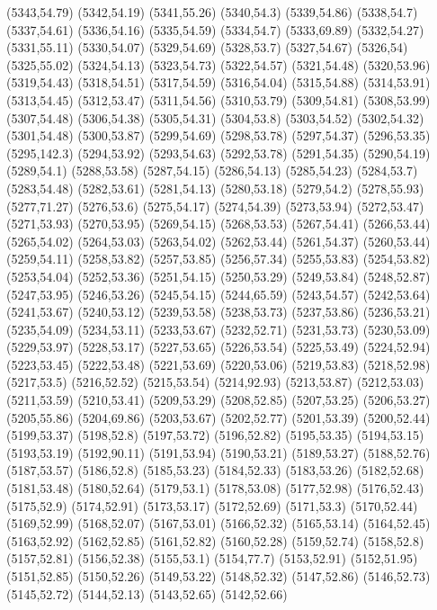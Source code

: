 (5343,54.79)
(5342,54.19)
(5341,55.26)
(5340,54.3)
(5339,54.86)
(5338,54.7)
(5337,54.61)
(5336,54.16)
(5335,54.59)
(5334,54.7)
(5333,69.89)
(5332,54.27)
(5331,55.11)
(5330,54.07)
(5329,54.69)
(5328,53.7)
(5327,54.67)
(5326,54)
(5325,55.02)
(5324,54.13)
(5323,54.73)
(5322,54.57)
(5321,54.48)
(5320,53.96)
(5319,54.43)
(5318,54.51)
(5317,54.59)
(5316,54.04)
(5315,54.88)
(5314,53.91)
(5313,54.45)
(5312,53.47)
(5311,54.56)
(5310,53.79)
(5309,54.81)
(5308,53.99)
(5307,54.48)
(5306,54.38)
(5305,54.31)
(5304,53.8)
(5303,54.52)
(5302,54.32)
(5301,54.48)
(5300,53.87)
(5299,54.69)
(5298,53.78)
(5297,54.37)
(5296,53.35)
(5295,142.3)
(5294,53.92)
(5293,54.63)
(5292,53.78)
(5291,54.35)
(5290,54.19)
(5289,54.1)
(5288,53.58)
(5287,54.15)
(5286,54.13)
(5285,54.23)
(5284,53.7)
(5283,54.48)
(5282,53.61)
(5281,54.13)
(5280,53.18)
(5279,54.2)
(5278,55.93)
(5277,71.27)
(5276,53.6)
(5275,54.17)
(5274,54.39)
(5273,53.94)
(5272,53.47)
(5271,53.93)
(5270,53.95)
(5269,54.15)
(5268,53.53)
(5267,54.41)
(5266,53.44)
(5265,54.02)
(5264,53.03)
(5263,54.02)
(5262,53.44)
(5261,54.37)
(5260,53.44)
(5259,54.11)
(5258,53.82)
(5257,53.85)
(5256,57.34)
(5255,53.83)
(5254,53.82)
(5253,54.04)
(5252,53.36)
(5251,54.15)
(5250,53.29)
(5249,53.84)
(5248,52.87)
(5247,53.95)
(5246,53.26)
(5245,54.15)
(5244,65.59)
(5243,54.57)
(5242,53.64)
(5241,53.67)
(5240,53.12)
(5239,53.58)
(5238,53.73)
(5237,53.86)
(5236,53.21)
(5235,54.09)
(5234,53.11)
(5233,53.67)
(5232,52.71)
(5231,53.73)
(5230,53.09)
(5229,53.97)
(5228,53.17)
(5227,53.65)
(5226,53.54)
(5225,53.49)
(5224,52.94)
(5223,53.45)
(5222,53.48)
(5221,53.69)
(5220,53.06)
(5219,53.83)
(5218,52.98)
(5217,53.5)
(5216,52.52)
(5215,53.54)
(5214,92.93)
(5213,53.87)
(5212,53.03)
(5211,53.59)
(5210,53.41)
(5209,53.29)
(5208,52.85)
(5207,53.25)
(5206,53.27)
(5205,55.86)
(5204,69.86)
(5203,53.67)
(5202,52.77)
(5201,53.39)
(5200,52.44)
(5199,53.37)
(5198,52.8)
(5197,53.72)
(5196,52.82)
(5195,53.35)
(5194,53.15)
(5193,53.19)
(5192,90.11)
(5191,53.94)
(5190,53.21)
(5189,53.27)
(5188,52.76)
(5187,53.57)
(5186,52.8)
(5185,53.23)
(5184,52.33)
(5183,53.26)
(5182,52.68)
(5181,53.48)
(5180,52.64)
(5179,53.1)
(5178,53.08)
(5177,52.98)
(5176,52.43)
(5175,52.9)
(5174,52.91)
(5173,53.17)
(5172,52.69)
(5171,53.3)
(5170,52.44)
(5169,52.99)
(5168,52.07)
(5167,53.01)
(5166,52.32)
(5165,53.14)
(5164,52.45)
(5163,52.92)
(5162,52.85)
(5161,52.82)
(5160,52.28)
(5159,52.74)
(5158,52.8)
(5157,52.81)
(5156,52.38)
(5155,53.1)
(5154,77.7)
(5153,52.91)
(5152,51.95)
(5151,52.85)
(5150,52.26)
(5149,53.22)
(5148,52.32)
(5147,52.86)
(5146,52.73)
(5145,52.72)
(5144,52.13)
(5143,52.65)
(5142,52.66)
